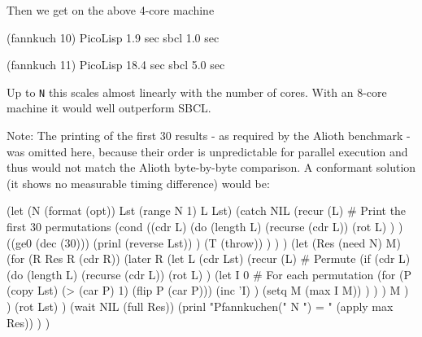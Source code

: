 Then we get on the above 4-core machine
\begin{wideverbatim}
   (fannkuch 10)
      PicoLisp     1.9 sec
      sbcl         1.0 sec

   (fannkuch 11)
      PicoLisp    18.4 sec
      sbcl         5.0 sec
\end{wideverbatim}

Up to \texttt{N} this scales almost linearly with the number of cores. With an 8-core
machine it would well outperform SBCL.

Note: The printing of the first 30 results - as required by the Alioth
benchmark - was omitted here, because their order is unpredictable for parallel
execution and thus would not match the Alioth byte-by-byte comparison.
A conformant solution (it shows no measurable timing difference) would be:
\begin{wideverbatim}
   (let (N (format (opt))  Lst (range N 1)  L Lst)
      (catch NIL
         (recur (L)  # Print the first 30 permutations
            (cond
               ((cdr L)
                  (do (length L)
                     (recurse (cdr L))
                     (rot L) ) )
               ((ge0 (dec (30)))
                  (prinl (reverse Lst)) )
               (T (throw)) ) ) )
      (let (Res (need N)  M)
         (for (R Res R (cdr R))
            (later R
               (let L (cdr Lst)
                  (recur (L)  # Permute
                     (if (cdr L)
                        (do (length L)
                           (recurse (cdr L))
                           (rot L) )
                        (let I 0  # For each permutation
                           (for (P (copy Lst)  (> (car P) 1)  (flip P (car P)))
                              (inc 'I) )
                           (setq M (max I M)) ) ) )
                  M ) )
            (rot Lst) )
         (wait NIL (full Res))
         (prinl "Pfannkuchen(" N ") = " (apply max Res)) ) )
\end{wideverbatim}


